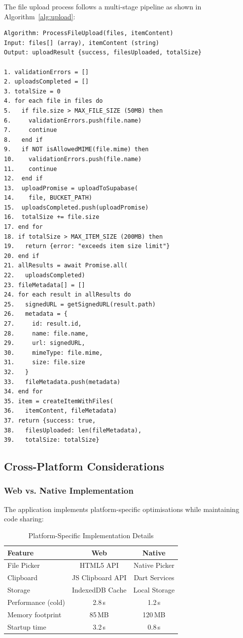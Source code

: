 \documentclass[10pt,twocolumn,a4paper]{article}
\begin{document}
The file upload process follows a multi-stage pipeline as shown in Algorithm~\ref{alg:upload}:

\begin{lstlisting}[caption={File Upload Processing Pipeline},label={alg:upload},
    basicstyle=\ttfamily\tiny,float=h]
Algorithm: ProcessFileUpload(files, itemContent)
Input: files[] (array), itemContent (string)
Output: uploadResult {success, filesUploaded, totalSize}

1. validationErrors = []
2. uploadsCompleted = []
3. totalSize = 0
4. for each file in files do
5.   if file.size > MAX_FILE_SIZE (50MB) then
6.     validationErrors.push(file.name)
7.     continue
8.   end if
9.   if NOT isAllowedMIME(file.mime) then
10.    validationErrors.push(file.name)
11.    continue
12.  end if
13.  uploadPromise = uploadToSupabase(
14.    file, BUCKET_PATH)
15.  uploadsCompleted.push(uploadPromise)
16.  totalSize += file.size
17. end for
18. if totalSize > MAX_ITEM_SIZE (200MB) then
19.   return {error: "exceeds item size limit"}
20. end if
21. allResults = await Promise.all(
22.   uploadsCompleted)
23. fileMetadata[] = []
24. for each result in allResults do
25.   signedURL = getSignedURL(result.path)
26.   metadata = {
27.     id: result.id,
28.     name: file.name,
29.     url: signedURL,
30.     mimeType: file.mime,
31.     size: file.size
32.   }
33.   fileMetadata.push(metadata)
34. end for
35. item = createItemWithFiles(
36.   itemContent, fileMetadata)
37. return {success: true,
38.   filesUploaded: len(fileMetadata),
39.   totalSize: totalSize}
\end{lstlisting}

\subsection{Cross-Platform Considerations}

\subsubsection{Web vs. Native Implementation}

The application implements platform-specific optimisations while maintaining code sharing:

\begin{table}[h]
\centering
\caption{Platform-Specific Implementation Details}
\label{tab:platforms}
\small
\begin{tabular}{|l|c|c|}
\hline
\textbf{Feature}         & \textbf{Web}     & \textbf{Native} \\
\hline
File Picker             & HTML5 API        & Native Picker \\
Clipboard              & JS Clipboard API & Dart Services \\
Storage                & IndexedDB Cache  & Local Storage \\
Performance (cold)      & 2.8\,s           & 1.2\,s \\
Memory footprint        & 85\,MB           & 120\,MB \\
Startup time            & 3.2\,s           & 0.8\,s \\
\hline
\end{tabular}
\end{table}
\end{document}
